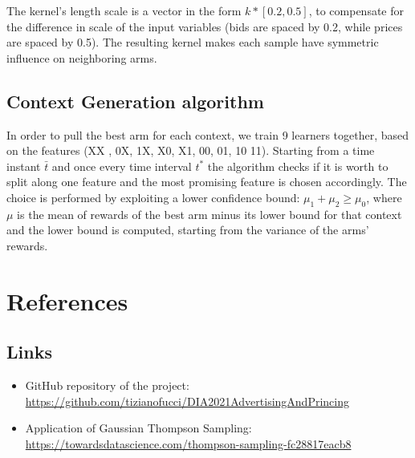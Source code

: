 \documentclass[12pt,a4paper]{report}
\begin{document}
The kernel's length scale is a vector in the form $k*[0.2, 0.5]$, to compensate for the difference in scale of the input variables (bids are spaced by 0.2, while prices are spaced by 0.5). The resulting kernel makes each sample have symmetric influence on neighboring arms.
\section{Context Generation algorithm}
In order to pull the best arm for each context, we train  9 learners together, based on the features (XX , 0X, 1X, X0, X1, 00, 01, 10 11). 
Starting from a time instant $\bar t$ and once every time interval $t^*$ the algorithm checks if it is worth to split along one feature and   
the most promising feature is chosen accordingly. The choice is performed by exploiting a lower confidence bound: $\mu_1 + \mu_2 \geq \mu_0$, where $\mu$ is the mean of rewards of the best arm minus its lower bound for that context and the lower bound is computed, starting from the variance of the arms' rewards.


	\chapter{References}
		\label{chap:ref}
		\section{Links}

\begin{itemize}
	\item GitHub repository of the project: \url{https://github.com/tizianofucci/DIA2021AdvertisingAndPrincing}
	\item Application of Gaussian Thompson Sampling: \url{https://towardsdatascience.com/thompson-sampling-fc28817eacb8}
\end{itemize}
\end{document}
